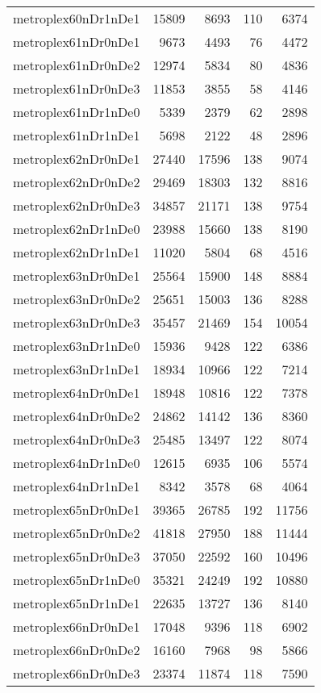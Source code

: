 \begin{longtable}{lrrrr}
metroplex60nDr1nDe1 & 15809 & 8693 & 110 & 6374 \\
metroplex61nDr0nDe1 & 9673 & 4493 & 76 & 4472 \\
metroplex61nDr0nDe2 & 12974 & 5834 & 80 & 4836 \\
metroplex61nDr0nDe3 & 11853 & 3855 & 58 & 4146 \\
metroplex61nDr1nDe0 & 5339 & 2379 & 62 & 2898 \\
metroplex61nDr1nDe1 & 5698 & 2122 & 48 & 2896 \\
metroplex62nDr0nDe1 & 27440 & 17596 & 138 & 9074 \\
metroplex62nDr0nDe2 & 29469 & 18303 & 132 & 8816 \\
metroplex62nDr0nDe3 & 34857 & 21171 & 138 & 9754 \\
metroplex62nDr1nDe0 & 23988 & 15660 & 138 & 8190 \\
metroplex62nDr1nDe1 & 11020 & 5804 & 68 & 4516 \\
metroplex63nDr0nDe1 & 25564 & 15900 & 148 & 8884 \\
metroplex63nDr0nDe2 & 25651 & 15003 & 136 & 8288 \\
metroplex63nDr0nDe3 & 35457 & 21469 & 154 & 10054 \\
metroplex63nDr1nDe0 & 15936 & 9428 & 122 & 6386 \\
metroplex63nDr1nDe1 & 18934 & 10966 & 122 & 7214 \\
metroplex64nDr0nDe1 & 18948 & 10816 & 122 & 7378 \\
metroplex64nDr0nDe2 & 24862 & 14142 & 136 & 8360 \\
metroplex64nDr0nDe3 & 25485 & 13497 & 122 & 8074 \\
metroplex64nDr1nDe0 & 12615 & 6935 & 106 & 5574 \\
metroplex64nDr1nDe1 & 8342 & 3578 & 68 & 4064 \\
metroplex65nDr0nDe1 & 39365 & 26785 & 192 & 11756 \\
metroplex65nDr0nDe2 & 41818 & 27950 & 188 & 11444 \\
metroplex65nDr0nDe3 & 37050 & 22592 & 160 & 10496 \\
metroplex65nDr1nDe0 & 35321 & 24249 & 192 & 10880 \\
metroplex65nDr1nDe1 & 22635 & 13727 & 136 & 8140 \\
metroplex66nDr0nDe1 & 17048 & 9396 & 118 & 6902 \\
metroplex66nDr0nDe2 & 16160 & 7968 & 98 & 5866 \\
metroplex66nDr0nDe3 & 23374 & 11874 & 118 & 7590 \\

\end{longtable}
